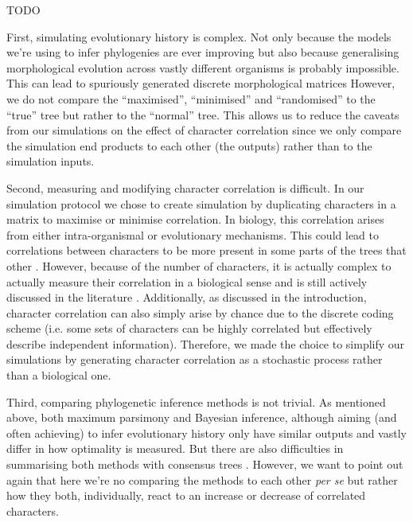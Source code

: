 \documentclass[12pt,letterpaper]{article}
\begin{document}
TODO


First, simulating evolutionary history is complex.
Not only because the models we're using to infer phylogenies are ever improving \citep[e.g.][]{heath2014fossilized,Wright01072016} but also because generalising morphological evolution across vastly different organisms is probably impossible.
This can lead to spuriously generated discrete morphological matrices
However, we do not compare the ``maximised'', ``minimised'' and ``randomised'' to the ``true'' tree but rather to the ``normal'' tree.
This allows us to reduce the caveats from our simulations on the effect of character correlation since we only compare the simulation end products to each other (the outputs) rather than to the simulation inputs.

Second, measuring and modifying character correlation is difficult. 
In our simulation protocol we chose to create simulation by duplicating characters in a matrix to maximise or minimise correlation.
In biology, this correlation arises from either intra-organismal or evolutionary mechanisms.
This could lead to correlations between characters to be more present in some parts of the trees that other \citep[e.g. in the case of inapplicable data ][]{BrazeauNA}.
However, because of the number of characters, it is actually complex to actually measure their correlation in a biological sense and is still actively discussed in the literature \citep{Lande1983,Maddison1990,Pagel1994,Pagel2006,goswami2006morphological,goswami2010,goswami2014macroevolutionary,Grabowski2016}.
Additionally, as discussed in the introduction, character correlation can also simply arise by chance due to the discrete coding scheme (i.e. some sets of characters can be highly correlated but effectively describe independent information).
Therefore, we made the choice to simplify our simulations by generating character correlation as a stochastic process rather than a biological one.

Third, comparing phylogenetic inference methods is not trivial.
As mentioned above, both maximum parsimony and Bayesian inference, although aiming (and often achieving) to infer evolutionary history only have similar outputs and vastly differ in how optimality is measured.
But there are also difficulties in summarising both methods with consensus trees \cite{oReilly2017efficacy}.
However, we want to point out again that here we're no comparing the methods to each other \textit{per se} but rather how they both, individually, react to an increase or decrease of correlated characters.
\end{document}
